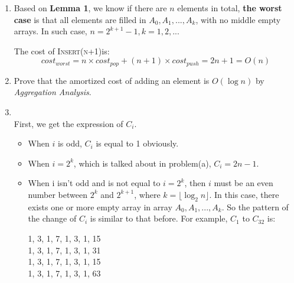 \documentclass[12pt,a4paper]{article}
\makeatletter
\newtheorem*{solution}{Solution}
\theoremstyle{definition}
\renewenvironment{solution}[1][Solution] {\par\pushQED{\qed}\normalfont\topsep6\p@\@plus6\p@\relax\trivlist\item[\hskip\labelsep\bfseries#1\@addpunct{.}]\ignorespaces}{\popQED\endtrivlist\@endpefalse} \makeatother
\makeatother
\begin{document}
\begin{enumerate}
\begin{enumerate}
\begin{solution}
        Based on \textbf{Lemma 1}, we know if there are $n$ elements in total, \textbf{the worst case} is that all elements are filled in $A_0, A_1,...,A_k$, with no middle empty arrays. In such case, $n=2^{k+1}-1, k =1,2,..$.
        
        The cost of \textsc{Insert(n+1)}is:
        $$
        cost_{worst} = n\times cost_{pop} + (n+1)\times cost_{push} = 2n+1 = O(n)
        $$
        \end{solution}
        
        \item Prove that the amortized cost of adding an element is $O(\log n)$ by \emph{Aggregation Analysis}.
        
        \begin{solution}
        ~\\
        First, we get the expression of $C_i$. 
        \begin{itemize}
            \item 
        When $i$ is odd, $C_i$ is equal to 1 obviously. 
        \item 
        When $i=2^k$, which is talked about in problem(a), $C_i=2n-1$. 
        \item
        When i isn't odd and is not equal to $i=2^k$, then $i$ must be an even number between $2^{k}$ and $2^{k+1}$, where $k=\lfloor \log_2 n\rfloor$. In this case, there exists one or more empty array in array $A_0, A_1,...,A_k$. So the pattern of the change of $C_i$ is similar to that before. For example, $C_1$ to $C_{32}$ is:
        \begin{center}
        
        1, {\color{red}3}, 1, {\color{red}7}, 1, 3, 1, {\color{red}15}\\
        1, 3, 1, 7, 1, 3, 1, {\color{red}31}\\
        1, 3, 1, 7, 1, 3, 1, 15\\
        1, 3, 1, 7, 1, 3, 1, {\color{red}63}\\
        

\end{center}
\end{itemize}
\end{solution}
\end{enumerate}
\end{enumerate}
\end{document}
